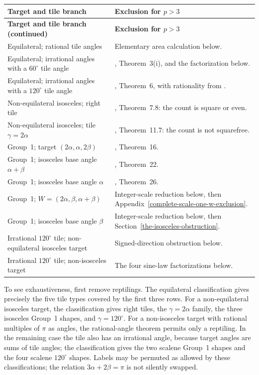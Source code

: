 \documentclass[
  11pt,
  a4paper,
]{article}
\begin{document}
\begin{longtable}{@{}>{\raggedright\arraybackslash}p{}>{\raggedright\arraybackslash}p{}@{}}
\toprule
\textbf{Target and tile branch} & \textbf{Exclusion for $p>3$}\\
\midrule
\endfirsthead
\toprule
\textbf{Target and tile branch (continued)} & \textbf{Exclusion for $p>3$}\\
\midrule
\endhead
\bottomrule
\endfoot
Equilateral; rational tile angles & Elementary area calculation below.\\[3pt]
Equilateral; irrational angles with a $60^\circ$ tile angle &
\cite{equilateral}, Theorem~3(i), and the factorization below.\\[3pt]
Equilateral; irrational angles with a $120^\circ$ tile angle &
\cite{equilateral}, Theorem~6, with rationality from \cite{rationality}.\\[3pt]
Non-equilateral isosceles; right tile &
\cite{isosceles}, Theorem~7.8: the count is square or even.\\[3pt]
Non-equilateral isosceles; tile $\gamma=2\alpha$ &
\cite{isosceles}, Theorem~11.7: the count is not squarefree.\\[3pt]
Group~1; target $(2\alpha,\alpha,2\beta)$ &
\cite{group1}, Theorem~16.\\[3pt]
Group~1; isosceles base angle $\alpha+\beta$ &
\cite{group1}, Theorem~22.\\[3pt]
Group~1; isosceles base angle $\alpha$ &
\cite{group1}, Theorem~26.\\[3pt]
Group~1; $W=(2\alpha,\beta,\alpha+\beta)$ &
Integer-scale reduction below, then Appendix~\ref{complete-scale-one-w-exclusion}.\\[3pt]
Group~1; isosceles base angle $\beta$ &
Integer-scale reduction below, then Section~\ref{the-isosceles-obstruction}.\\[3pt]
Irrational $120^\circ$ tile; non-equilateral isosceles target &
Signed-direction obstruction below.\\[3pt]
Irrational $120^\circ$ tile; non-isosceles target &
The four sine-law factorizations below.\\
\end{longtable}

To see exhaustiveness, first remove reptilings. The equilateral
classification gives precisely the five tile types covered by the first
three rows. For a non-equilateral isosceles target, the classification
gives right tiles, the $\gamma=2\alpha$ family, the three isosceles
Group~1 shapes, and $\gamma=120^\circ$. For a non-isosceles target with
rational multiples of $\pi$ as angles, the rational-angle theorem
permits only a reptiling. In the remaining case the tile also has an
irrational angle, because target angles are sums of tile angles; the
classification gives the two scalene Group~1 shapes and the four
scalene $120^\circ$ shapes. Labels may be permuted as allowed by these
classifications; the relation $3\alpha+2\beta=\pi$ is not silently
swapped.
\end{document}
